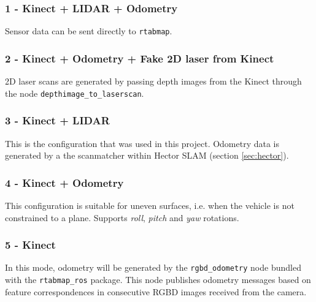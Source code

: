 \subsubsection{1 - Kinect + LIDAR + Odometry} 
Sensor data can be sent directly to \texttt{rtabmap}.

\subsubsection{2 - Kinect + Odometry + Fake 2D laser from Kinect}

2D laser scans are generated by passing depth images from the Kinect through the node \texttt{depthimage\_to\_laserscan}.

\subsubsection{3 - Kinect + LIDAR}

This is the configuration that was used in this project. Odometry data is generated by a the scanmatcher within Hector SLAM (section \ref{sec:hector}). 

\subsubsection{4 - Kinect + Odometry}

This configuration is suitable for uneven surfaces, i.e. when the vehicle is not constrained to a plane. Supports \textit{roll}, \textit{pitch} and \textit{yaw} rotations.

\subsubsection{5 - Kinect}

In this mode, odometry will be generated by the \texttt{rgbd\_odometry} node bundled with the \texttt{rtabmap\_ros} package. This node publishes odometry messages based on feature correspondences in consecutive RGBD images received from the camera.


